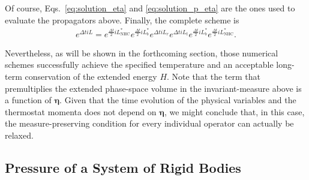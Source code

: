 \documentclass[aip,jcp,reprint,amsmath,amssymb]{revtex4-1}
\newcommand{\vt}[1]{\boldsymbol{\mathbf{#1}}}           %
\begin{document}
Of course, Eqs.~\ref{eq:solution_eta} and \ref{eq:solution_p_eta} are the ones used to evaluate the propagators above. Finally, the complete scheme is
\begin{equation}
\label{eq:modified_splitting}
\begin{split}
e^{\Delta t i\!L} = e^{\frac{\Delta t}{2} i\!L_\text{NHC}^\ast} e^{\frac{\Delta t}{2} i\!L_b^\ast} e^{\Delta t i\!L_r} e^{\Delta t i\!L_t}  e^{\frac{\Delta t}{2} i\!L_b^\ast} e^{\frac{\Delta t}{2} i\!L_\text{NHC}^\ast}.
\end{split}
\end{equation}

 Nevertheless, as will be shown in the forthcoming section, those numerical schemes successfully achieve the specified temperature and an acceptable long-term conservation of the extended energy $H$. Note that the term that premultiplies the extended phase-space volume in the invariant-measure above is a function of $\vt \eta$. Given that the time evolution of the physical variables and the thermostat momenta does not depend on $\vt \eta$, we might conclude that, in this case, the measure-preserving condition for every individual operator can actually be relaxed.

\subsection{Pressure of a System of Rigid Bodies}
\label{sec:pressure}
\end{document}
